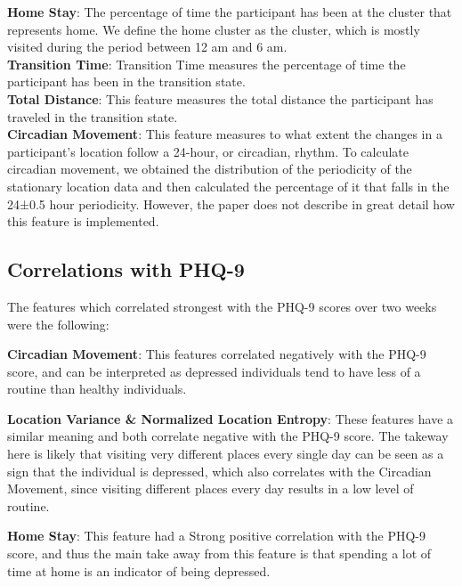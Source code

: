 \textbf{Home Stay}: The percentage of time the participant has been at the cluster that represents home. We define the home cluster as the cluster, which is mostly visited during the period between 12 am and 6 am.\\

\textbf{Transition Time}: Transition Time measures the percentage of time the participant has been in the transition state.\\

\textbf{Total Distance}: This feature measures the total distance the participant has traveled in the transition state.\\

\textbf{Circadian Movement}: This feature measures to what extent the changes in a
participant’s location follow a 24-hour, or circadian, rhythm. To calculate circadian movement, we obtained the distribution of the periodicity of the stationary location data and then calculated the percentage of it that falls in the 24±0.5 hour periodicity. However, the paper does not describe in great detail how this feature is implemented.\\

\subsection{Correlations with PHQ-9}
The features which correlated strongest with the PHQ-9 scores over two weeks were the following:

\textbf{Circadian Movement}: This features correlated negatively with the PHQ-9 score, and can be interpreted as depressed individuals tend to have less of a routine than healthy individuals.  

\textbf{Location Variance \& Normalized Location Entropy}: These features have a similar meaning and both correlate negative with the PHQ-9 score. The takeway here is likely that visiting very different places every single day can be seen as a sign that the individual is depressed, which also correlates with the Circadian Movement, since visiting different places every day results in a low level of routine. 

\textbf{Home Stay}: This feature had a Strong positive correlation with the PHQ-9 score, and thus the main take away from this feature is that spending a lot of time at home is an indicator of being depressed.

